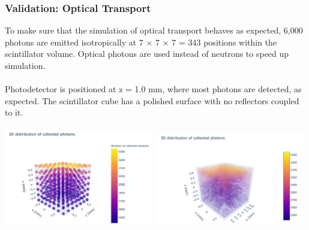 \documentclass[xcolor=x11names, compress, handout]{beamer}
\renewcommand{\(}{\begin{columns}}
\renewcommand{\)}{\end{columns}}
\newcommand{\<}[1]{\begin{column}{#1}}
\renewcommand{\>}{\end{column}}
\begin{document}
\begin{frame}
  \frametitle{Validation: Optical Transport}
  \scriptsize 
  To make sure that the simulation of optical transport behaves as expected, 6,000 photons are emitted isotropically at 7 $\times$ 7 $\times$ 7 = 343 positions within the scintillator volume. Optical photons are used instead of neutrons to speed up simulation.\\
  \ \\
  Photodetector is positioned at z = 1.0 mm, where most photons are detected, as expected. The scintillator cube has a polished surface with no reflectors coupled to it.   \\
  \ \\
  \centering
  \includegraphics[width=0.49\textwidth, height=0.45\textheight]{images/distribution.png}
  \includegraphics[width=0.49\textwidth, height=0.45\textheight]{images/distribution1.png}
  \ \\
\end{frame}
\end{document}
